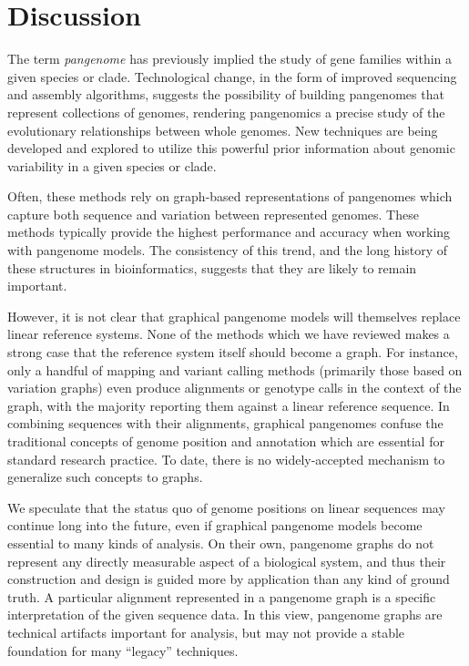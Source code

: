 \section{Discussion}

The term \emph{pangenome} has previously implied the study of gene families within a given species or clade.
Technological change, in the form of improved sequencing and assembly algorithms, suggests the possibility of building pangenomes that represent collections of genomes, rendering pangenomics a precise study of the evolutionary relationships between whole genomes.
New techniques are being developed and explored to utilize this powerful prior information about genomic variability in a given species or clade.

Often, these methods rely on graph-based representations of pangenomes which capture both sequence and variation between represented genomes.
These methods typically provide the highest performance and accuracy when working with pangenome models.
The consistency of this trend, and the long history of these structures in bioinformatics, suggests that they are likely to remain important.

However, it is not clear that graphical pangenome models will themselves replace linear reference systems.
None of the methods which we have reviewed makes a strong case that the reference system itself should become a graph.
For instance, only a handful of mapping and variant calling methods (primarily those based on variation graphs) even produce alignments or genotype calls in the context of the graph, with the majority reporting them against a linear reference sequence.
In combining sequences with their alignments, graphical pangenomes confuse the traditional concepts of genome position and annotation which are essential for standard research practice.
To date, there is no widely-accepted mechanism to generalize such concepts to graphs.

We speculate that the status quo of genome positions on linear sequences may continue long into the future, even if graphical pangenome models become essential to many kinds of analysis.
On their own, pangenome graphs do not represent any directly measurable aspect of a biological system, and thus their construction and design is guided more by application than any kind of ground truth.
A particular alignment represented in a pangenome graph is a specific interpretation of the given sequence data.
In this view, pangenome graphs are technical artifacts important for analysis, but may not provide a stable foundation for many ``legacy'' techniques.

